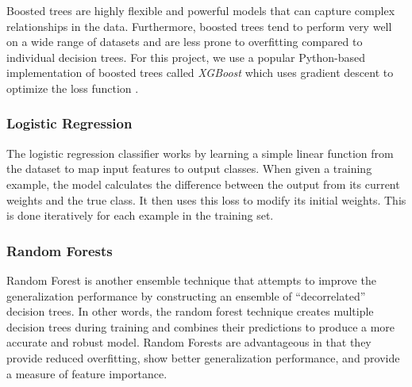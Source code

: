 \documentclass[./main.tex]{subfiles}
\begin{document}
Boosted trees are highly flexible and powerful models that can capture complex relationships in the data. Furthermore, boosted trees tend to perform very well on a wide range of datasets and are less prone to overfitting compared to individual decision trees. For this project, we use a popular Python-based implementation of boosted trees called \textit{XGBoost} which uses gradient descent to optimize the loss function \cite{Chen:2016:XST:2939672.2939785}. 

\subsubsection{Logistic Regression}
The logistic regression classifier works by learning a simple linear function from the dataset to map input features to output classes. When given a training example, the model calculates the difference between the output from its current weights and the true class. It then uses this loss to modify its initial weights. This is done iteratively for each example in the training set.

\subsubsection{Random Forests}
Random Forest is another ensemble technique that attempts to improve the generalization performance by constructing an ensemble of ``decorrelated'' decision trees. In other words, the random forest technique creates multiple decision trees during training and combines their predictions to produce a more accurate and robust model. Random Forests are advantageous in that they provide reduced overfitting, show better generalization performance, and provide a measure of feature importance.
\end{document}
